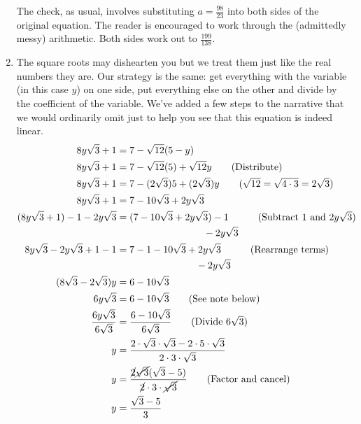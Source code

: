 \begin{ex}
\begin{enumerate}
The check, as usual, involves substituting $a = \frac{98}{23}$ into both sides of the original equation.  The reader is encouraged to work through the (admittedly messy) arithmetic.  Both sides work out to $\frac{199}{138}$.


\item  The square roots may dishearten you but we treat them just like the real numbers they are.  Our strategy is the same:  get everything with the variable (in this case $y$) on one side, put everything else on the other and divide by the coefficient of the variable.  We've added a few steps to the narrative that we would ordinarily omit just to help you see that this equation is indeed linear.
\begin{align*}
8 y \sqrt{3} + 1 & = 7 - \sqrt{12}(5 - y) \\
8 y \sqrt{3} + 1 & = 7 - \sqrt{12}(5)  + \sqrt{12} y \tag{Distribute} \\
8 y \sqrt{3} + 1 & = 7 - (2 \sqrt{3})5 + (2 \sqrt{3})y \tag{$\sqrt{12} = \sqrt{4\cdot 3} = 2 \sqrt{3}$} \\
8 y \sqrt{3} + 1 & = 7 - 10 \sqrt{3} + 2y \sqrt{3}  \\
(8 y \sqrt{3} + 1) - 1 - 2y\sqrt{3} & = \begin{multlined}[t] (7 - 10 \sqrt{3} + 2y \sqrt{3}) - 1 \\
	- 2y\sqrt{3} \end{multlined} \tag{Subtract $1$ and $2y\sqrt{3}$}  \\
8 y \sqrt{3} - 2y\sqrt{3} + 1 - 1 & = \begin{multlined}[t] 7 - 1 - 10 \sqrt{3} + 2y \sqrt{3} \\
	- 2y\sqrt{3} \end{multlined}  \tag{Rearrange terms}  \\
(8\sqrt{3}-2\sqrt{3})y & = 6 - 10 \sqrt{3}  & \\
6 y \sqrt{3} & = 6 - 10 \sqrt{3}  \tag{See note below} \\
\dfrac{6 y \sqrt{3}}{6 \sqrt{3}}  & = \dfrac{6 - 10 \sqrt{3}}{6 \sqrt{3}}  \tag{Divide $6\sqrt{3}$} \\
y & = \dfrac{2 \cdot \sqrt{3} \cdot \sqrt{3} - 2 \cdot 5 \cdot \sqrt{3}}{2 \cdot 3 \cdot \sqrt{3}} & \\
y & = \dfrac{\cancel{2} \cancel{\sqrt{3}}(\sqrt{3} - 5)}{\cancel{2} \cdot 3 \cdot \cancel{\sqrt{3}}} \tag{Factor and cancel} \\
y & = \dfrac{\sqrt{3} - 5}{3} \\
\end{align*}


\end{enumerate}
\end{ex}
